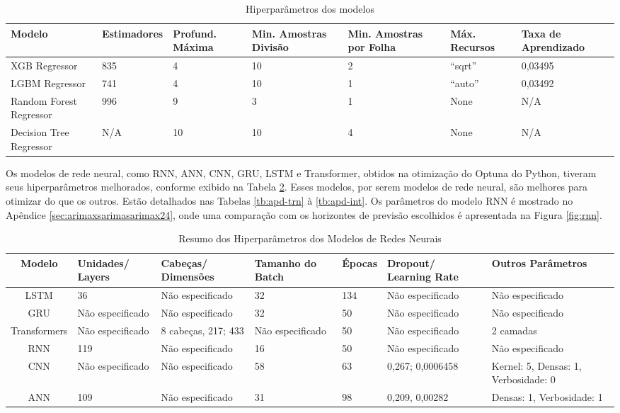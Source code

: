 \begin{table}[tb]
	\centering
	\caption{Hiperparâmetros dos modelos}
	\label{tab:hiperparametros}
	\begin{tabular}{p{2.2cm}p{2.8cm}p{1.9cm}p{2cm}p{2cm}p{2cm}p{2cm}}
		\hline
		\textbf{Modelo} & \textbf{Estimadores} & \textbf{Profund. Máxima} & \textbf{Min. Amostras Divisão} & \textbf{Min. Amostras por Folha} & \textbf{Máx. Recursos} & \textbf{Taxa de Aprendizado} \\
		\hline
		XGB Regressor & 835 & 4 & 10 & 2 &``sqrt'' & 0,03495 \\
		LGBM Regressor & 741 & 4 & 10 & 1 & ``auto'' & 0,03492 \\
		Random Forest Regressor & 996 & 9 & 3 & 1 & None & N/A \\
		Decision Tree Regressor & N/A & 10 & 10 & 4 & None & N/A \\
		\hline
	\end{tabular}
	
\end{table}

Os modelos de rede neural, como RNN, ANN, CNN, GRU, LSTM e Transformer, obtidos na otimização do Optuna do Python, tiveram seus hiperparâmetros melhorados, conforme exibido na Tabela \ref{tab:hyperparameters_summary}. Esses modelos, por serem modelos de rede neural, são melhores para otimizar do que os outros. Estão detalhados nas Tabelas \ref{tb:apd-trn} à \ref{tb:apd-int}. Os parâmetros do modelo RNN é mostrado no Apêndice \ref{sec:arimaxsarimasarimax24}, onde uma comparação com os horizontes de previsão escolhidos é apresentada na Figura \ref{fig:rnn}.

\begin{table}[tb]
	\centering
	\caption{Resumo dos Hiperparâmetros dos Modelos de Redes Neurais}
	\label{tab:hyperparameters_summary}
	\small
	\begin{tabular}{cp{2cm}p{2cm}p{2cm}p{2cm}p{1.5cm}p{2cm}}
		\hline
		\textbf{Modelo} & \textbf{Unidades/ Layers} & \textbf{Cabeças/ Dimensões} & \textbf{Tamanho do Batch} & \textbf{Épocas} & \textbf{Dropout/ Learning Rate} & \textbf{Outros Parâmetros} \\
		\hline
		LSTM & 36 & Não especificado & 32 & 134 & Não especificado & Não especificado \\
		\hline
		GRU & Não especificado & Não especificado & 32 & 50 & Não especificado & Não especificado \\
		\hline
		Transformers & Não especificado & 8 cabeças, 217; 433 & Não especificado & 50 & Não especificado & 2 camadas \\
		\hline
		RNN & 119 & Não especificado & 16 & 50 & Não especificado & Não especificado \\
		\hline
		CNN & Não especificado & Não especificado & 58 & 63 & 0,267; 0,0006458 & Kernel: 5, Densas: 1, Verbosidade: 0 \\
		\hline
		ANN & 109 & Não especificado & 31 & 98 & 0,209, 0,00282 & Densas: 1, Verbosidade: 1 \\
		\hline
	\end{tabular}
	
\end{table}

